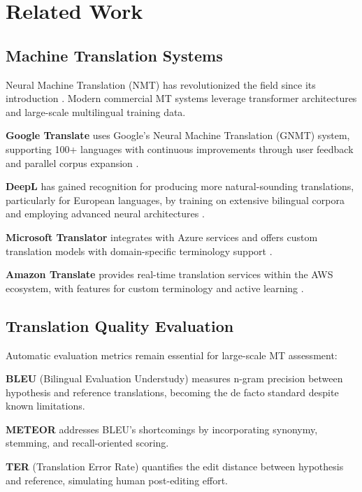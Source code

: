 \section{Related Work}

\subsection{Machine Translation Systems}

Neural Machine Translation (NMT) has revolutionized the field since its introduction \cite{sutskever2014sequence, bahdanau2014neural}. Modern commercial MT systems leverage transformer architectures \cite{vaswani2017attention} and large-scale multilingual training data.

\textbf{Google Translate} uses Google's Neural Machine Translation (GNMT) system, supporting 100+ languages with continuous improvements through user feedback and parallel corpus expansion \cite{wu2016google}.

\textbf{DeepL} has gained recognition for producing more natural-sounding translations, particularly for European languages, by training on extensive bilingual corpora and employing advanced neural architectures \cite{deepl2020}.

\textbf{Microsoft Translator} integrates with Azure services and offers custom translation models with domain-specific terminology support \cite{microsoft2020translator}.

\textbf{Amazon Translate} provides real-time translation services within the AWS ecosystem, with features for custom terminology and active learning \cite{amazon2019translate}.

\subsection{Translation Quality Evaluation}

Automatic evaluation metrics remain essential for large-scale MT assessment:

\textbf{BLEU} (Bilingual Evaluation Understudy) \cite{papineni2002bleu} measures n-gram precision between hypothesis and reference translations, becoming the de facto standard despite known limitations.

\textbf{METEOR} \cite{banerjee2005meteor} addresses BLEU's shortcomings by incorporating synonymy, stemming, and recall-oriented scoring.

\textbf{TER} (Translation Error Rate) \cite{snover2006study} quantifies the edit distance between hypothesis and reference, simulating human post-editing effort.

